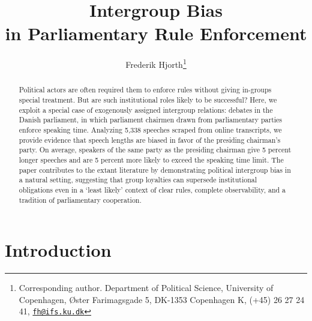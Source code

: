 \documentclass[12pt,a4paper]{article}
\title{ \textbf{Intergroup Bias \\ in Parliamentary Rule Enforcement}  }
\author{Frederik Hjorth\thanks{Corresponding author. Department of Political Science, University of Copenhagen, Øster Farimagsgade 5, DK-1353 Copenhagen K, (+45) 26 27 24 41, \texttt{\href{mailto:fh@ifs.ku.dk}{fh@ifs.ku.dk}}}}
\date{}
\begin{document}
\maketitle




\doublespacing

\begin{abstract}
\noindent Political actors are often required them to enforce rules without giving in-groups special treatment. But are such institutional roles likely to be successful? Here, we exploit a special case of exogenously assigned intergroup relations: debates in the Danish parliament, in which parliament chairmen drawn from parliamentary parties enforce speaking time. Analyzing 5,338 speeches scraped from online transcripts, we provide evidence that speech lengths are biased in favor of the presiding chairman's party. On average, speakers of the same party as the presiding chairman give 5 percent longer speeches and are 5 percent more likely to exceed the speaking time limit. The paper contributes to the extant literature by demonstrating political intergroup bias in a natural setting, suggesting that group loyalties can supersede institutional obligations even in a `least likely' context of clear rules, complete observability, and a tradition of parliamentary cooperation.
\end{abstract}

%



\newpage

\section{Introduction}
\end{document}
